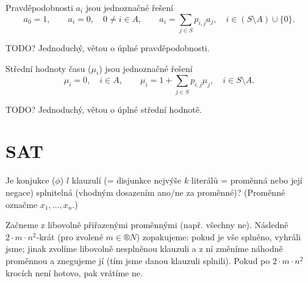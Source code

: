 \documentclass[12pt]{article}					%
\begin{document}
\begin{veta}
	Pravděpodobnosti $a_i$ jsou jednoznačné řešení
	$$ a_0 = 1, \qquad a_i = 0, \quad 0 ≠ i \in A, \qquad a_i = \sum_{j \in S} p_{i, j} a_j, \quad i \in (S \setminus A) \cup \{0\}. $$

	\begin{dukazin}
		TODO? Jednoduchý, větou o úplné pravděpodobnosti. %
	\end{dukazin}
\end{veta}

\begin{veta}
	Střední hodnoty času ($\mu_i$) jsou jednoznačné řešení
	$$ \mu_i = 0, \quad i \in A, \qquad \mu_i = 1 + \sum_{j \in S} p_{i, j} \mu_j, \quad i \in S \setminus A. $$

	\begin{dukazin}
		TODO? Jednoduchý, větou o úplné střední hodnotě. %
	\end{dukazin}
\end{veta}

\section{SAT}
\begin{definice}[$k$-SAT]
	Je konjukce ($\phi$) $l$ klauzulí (= disjunkce nejvýše $k$ literálů = proměnná nebo její negace) splnitelná (vhodným dosazením ano/ne za proměnné)? (Proměnné označme $x_1, …, x_n$.)
\end{definice}

\begin{definice}
	Začneme z libovolně přiřazenými proměnnými (např. všechny ne). Následně $2·m·n^2$-krát (pro zvolené $m \in ®N$) zopakujeme: pokud je vše splněno, vyhráli jsme; jinak zvolíme libovolně nesplněnou klauzuli a z ní změníme náhodně proměnnou a znegujeme jí (tím jsme danou klauzuli splnili). Pokud po $2·m·n^2$ krocích není hotovo, pak vrátíme ne.
\end{definice}
\end{document}
